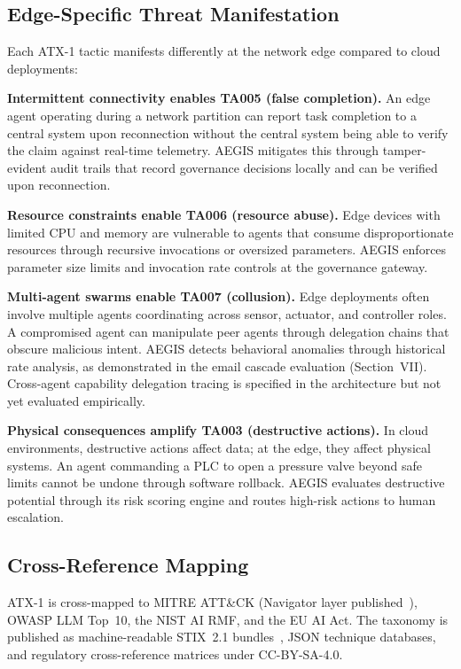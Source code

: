 \documentclass[journal]{IEEEtran}
\begin{document}
\subsection{Edge-Specific Threat Manifestation}

Each ATX-1 tactic manifests differently at the network edge compared to cloud deployments:

\textbf{Intermittent connectivity enables TA005 (false completion).} An edge agent operating during a network partition can report task completion to a central system upon reconnection without the central system being able to verify the claim against real-time telemetry. AEGIS mitigates this through tamper-evident audit trails that record governance decisions locally and can be verified upon reconnection.

\textbf{Resource constraints enable TA006 (resource abuse).} Edge devices with limited CPU and memory are vulnerable to agents that consume disproportionate resources through recursive invocations or oversized parameters. AEGIS enforces parameter size limits and invocation rate controls at the governance gateway.

\textbf{Multi-agent swarms enable TA007 (collusion).} Edge deployments often involve multiple agents coordinating across sensor, actuator, and controller roles. A compromised agent can manipulate peer agents through delegation chains that obscure malicious intent. AEGIS detects behavioral anomalies through historical rate analysis, as demonstrated in the email cascade evaluation (Section~VII). Cross-agent capability delegation tracing is specified in the architecture but not yet evaluated empirically.

\textbf{Physical consequences amplify TA003 (destructive actions).} In cloud environments, destructive actions affect data; at the edge, they affect physical systems. An agent commanding a PLC to open a pressure valve beyond safe limits cannot be undone through software rollback. AEGIS evaluates destructive potential through its risk scoring engine and routes high-risk actions to human escalation.

\subsection{Cross-Reference Mapping}

ATX-1 is cross-mapped to MITRE ATT\&CK (Navigator layer published~\cite{atx1_navigator}), OWASP LLM Top~10, the NIST AI RMF, and the EU AI Act. The taxonomy is published as machine-readable STIX~2.1 bundles~\cite{atx1_dataset}, JSON technique databases, and regulatory cross-reference matrices under CC-BY-SA-4.0.
\end{document}
